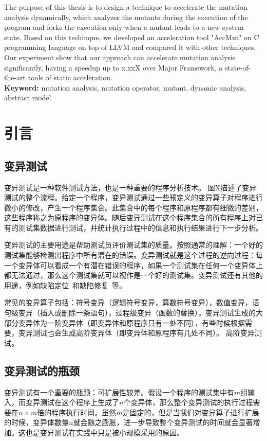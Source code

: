 \documentclass[nofonts]{ctexrep}
\begin{document}
The purpose of this thesis is to design a technique to accelerate the mutation analysis dynamically, which analyzes the mutants during the execution of the program and forks the execution only when a mutant leads to a new system state. Based on this techinque, we developed an acceleration tool "AccMut" on C programming language on top of LLVM and compared it with other techniques. Our experiment show that our approach can accelerate mutation analysis significantly, having a speedup up to x.xxX over Major Framework, a state-of-the-art tools of static acceleration. \\

\textbf{Keyword:} mutation analysis, mutation operator, mutant, dynamic analysis, abstract model
\tableofcontents


\chapter{引言}
\section{变异测试}
变异测试是一种软件测试方法，也是一种重要的程序分析技术\cite{demillo1978hints,hamlet1977testing}。
图X描述了变异测试的整个流程。给定一个程序，变异测试通过一些预定义的变异算子对程序进行微小的修改，产生一个程序集合。此集合中的每个程序和原程序都有细微的差别，这些程序称之为原程序的变异体。随后变异测试在这个程序集合的所有程序上对已有的测试集数据进行测试，并统计执行过程中的信息和执行结果进行下一步分析。


变异测试的主要用途是帮助测试员评价测试集的质量\cite{jia2011analysis}。按照通常的理解：一个好的测试集能够检测出程序中所有潜在的错误。变异测试就是这个过程的逆向过程：每一个变异体可以看成一个有潜在错误的程序，如果一个测试集在任何一个变异体上都无法通过，那么这个测试集就可以视作是一个好的测试集。变异测试还有其他的用途，例如缺陷定位~\cite{papadakis2012using,moon2014ask,zhang2013injecting}和缺陷修复~\cite{GenProg,PAR,RSRepair,AE}等。

常见的变异算子包括：符号变异（逻辑符号变异，算数符号变异），数值变异，语句级变异（插入或删除一条语句），过程级变异（函数的替换）。变异测试生成的大部分变异体为一阶变异体（即变异体和原程序只有一处不同），有些时候根据需要，变异测试也会生成高阶变异体（即变异体和原程序有几处不同）。
高阶变异测试。

\section{变异测试的瓶颈}
变异测试有一个重要的瓶颈：可扩展性较差。假设一个程序的测试集中有$m$组输入，而变异测试在这个程序上生成了$n$个变异体，那么整个变异测试的执行过程需要在$n\times m$倍的程序执行时间。虽然$m$是固定的，但是当我们对变异算子进行扩展的时候，变异体数量$n$就会随之膨胀，进一步导致整个变异测试的时间就会显著增加。这也是变异测试在实践中只是被小规模采用的原因。
\end{document}
